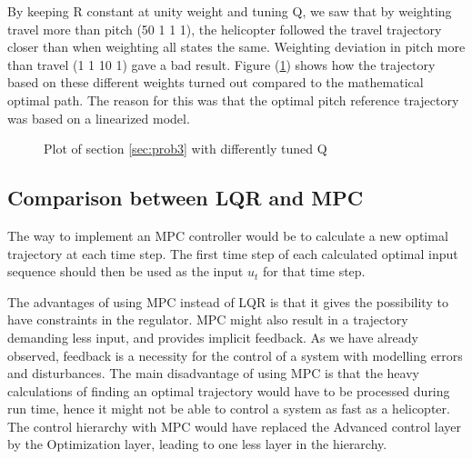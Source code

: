 By keeping R constant at unity weight and tuning Q, we saw that by weighting travel more than pitch (50 1 1 1), the helicopter followed the travel trajectory closer than when weighting all states the same. Weighting deviation in pitch more than travel (1 1 10 1) gave a bad result. Figure (\ref{fig:day3_plot_allQ}) shows how the trajectory based on these different weights turned out compared to the mathematical optimal path. The reason for this was that the optimal pitch reference trajectory was based on a linearized model.
\begin{figure}[htb]
	\centering
	\caption{Plot of section \ref{sec:prob3} with differently tuned Q}
	\label{fig:day3_plot_allQ}
\end{figure}




\subsection{Comparison between LQR and MPC}
The way to implement an MPC controller would be to calculate a new optimal trajectory at each time step. The first time step of each calculated optimal input sequence should then be used as the input $u_t$ for that time step.

The advantages of using MPC instead of LQR is that it gives the possibility to have constraints in the regulator. MPC might also result in a trajectory demanding less input, and provides implicit feedback. As we have already observed, feedback is a necessity for the control of a system with modelling errors and disturbances. 
The main disadvantage of using MPC is that the heavy calculations of finding an optimal trajectory would have to be processed during run time, hence it might not be able to control a system as fast as a helicopter.
The control hierarchy with MPC would have replaced the Advanced control layer by the Optimization layer, leading to one less layer in the hierarchy.

